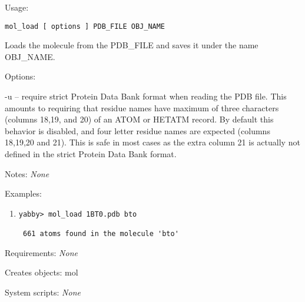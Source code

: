 \begin{description}


\item{Usage:}

{\tt mol\_load [ options ] PDB\_FILE OBJ\_NAME}

Loads the molecule from the PDB\_FILE and saves it under
the name OBJ\_NAME.


\item{Options:}
\begin{description}
\item -u -- require strict Protein Data Bank format when reading
 the PDB file. This amounts to requiring that residue names
 have maximum of three characters (columns 18,19, and 20) of
 an ATOM or HETATM record. By default this behavior is disabled,
 and four letter residue names are expected (columns 18,19,20
 and 21). This is safe in most cases as the extra column 21 is
 actually not defined in the strict Protein Data Bank format.
\end{description}


\item{Notes:} {\em None}


\item{Examples:}
\begin{enumerate}

\item
\begin{verbatim}
yabby> mol_load 1BT0.pdb bto

 661 atoms found in the molecule 'bto'

\end{verbatim}

\end{enumerate}


\item{Requirements:} {\em None}


\item{Creates objects:} mol


\item{System scripts:} {\em None}

\end{description}

